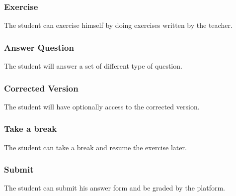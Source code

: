 		\subsubsection{Exercise}
			The student can exercise himself by doing exercises written by the teacher.
		\subsubsection{Answer Question}
			The student will answer a set of different type of question.
		\subsubsection{Corrected Version}
			The student will have optionally access to the corrected version.
		\subsubsection{Take a break}
			The student can take a break and resume the exercise later.
		\subsubsection{Submit}
			The student can submit his answer form and be graded by the platform.		
